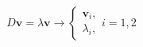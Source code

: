 \documentclass[preview]{standalone}
\begin{document}
\begin{align*}
D \bm v = \lambda \bm v \to \begin{cases} \bm v_i,\\ \lambda_i, \end{cases} i=1,2
\end{align*}
\end{document}
